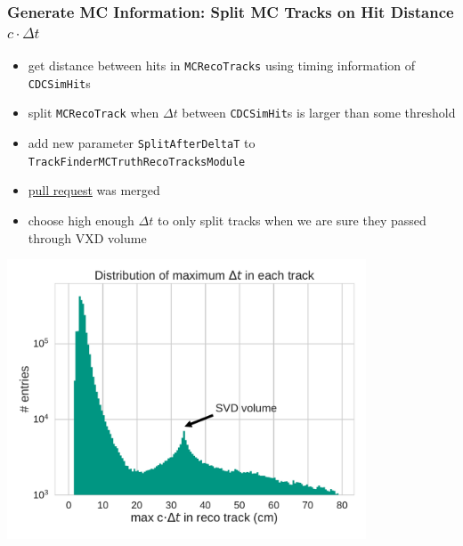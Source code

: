 \documentclass[18pt]{beamer}
\begin{document}
\begin{frame}
  \frametitle{Generate MC Information: Split MC Tracks on Hit Distance $c \cdot \Delta t$}
  \begin{itemize}
  \item get distance between hits in \texttt{MCRecoTracks} using timing information of \texttt{CDCSimHit}s
  \item split \texttt{MCRecoTrack} when  $\Delta t$ between \texttt{CDCSimHit}s is larger than some threshold
  \item add new parameter \texttt{SplitAfterDeltaT} to \texttt{TrackFinderMCTruthRecoTracksModule}
  \item \href{https://stash.desy.de/projects/B2/repos/software/pull-requests/737}{pull request} was merged
  \item choose high enough $\Delta t$ to only split tracks when we are sure they passed through VXD volume\\
  \end{itemize}
\end{frame}

\begin{frame}
    \begin{center}
    \includegraphics[width=0.8\textwidth]{figures/delta_t/delta_t_max_log_annotated.pdf}
  \end{center}
\end{frame}
\end{document}
